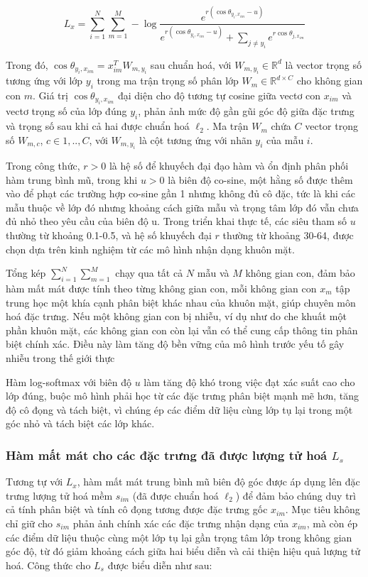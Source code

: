\begin{equation}
    L_x = \sum_{i=1}^N \sum_{m=1}^M - \log \frac{e^{r(\cos\theta_{y_i, x_{im}} - u)}}{e^{r(\cos\theta_{y_i, x_{im}} - u)} + \sum_{j \neq y_i} e^{r\cos\theta_{j, x_{im}}}}
\end{equation}

Trong đó, $\cos \theta_{y_i, x_{im}} = x^T_{im} W_{m,y_i}$ sau chuẩn hoá, với $W_{m,y_i} \in \mathbb{R}^d$ là vector trọng số tương ứng với lớp $y_i$ trong ma trận trọng số phân lớp $W_m \in \mathbb{R}^{d \times C}$ cho không gian con $m$. Giá trị $\cos \theta_{y_i, x_{im}}$ đại diện cho độ tương tự cosine giữa vectơ con $x_{im}$ và vectơ trọng số của lớp đúng $y_i$, phản ảnh mức độ gần gũi góc độ giữa đặc trưng và trọng số sau khi cả hai được chuẩn hoá $\ell_2$. Ma trận $W_m$ chứa $C$ vector trọng số $W_{m,c}$, $ c \in {1,..,C}$, với $W_{m,y_i}$ là cột tương ứng với nhãn $y_i$ của mẫu $i$.

Trong công thức, $r > 0$ là hệ số để khuyếch đại đạo hàm và ổn định phân phối hàm trung bình mũ, trong khi $u > 0$ là biên độ co-sine, một hằng số được thêm vào để phạt các trường hợp co-sine gần 1 nhưng không đủ cô đặc, tức là khi các mẫu thuộc về lớp đó nhưng khoảng cách giữa mẫu và trọng tâm lớp đó vẫn chưa đủ nhỏ theo yêu cầu của biên độ u. Trong triển khai thực tế, các siêu tham số $u$ thường từ khoảng 0.1-0.5, và hệ số khuyếch đại $r$ thường từ khoảng 30-64, được chọn dựa trên kinh nghiệm từ các mô hình nhận dạng khuôn mặt.

Tổng kép $ \sum_{i=1}^N \sum_{m=1}^M $ chạy qua tất cả $N$ mẫu và $M$ không gian con, đảm bảo hàm mất mát được tính theo từng không gian con, mỗi không gian con $x_m$ tập trung học một khía cạnh phân biệt khác nhau của khuôn mặt, giúp chuyên môn hoá đặc trưng. Nếu một không gian con bị nhiễu, ví dụ như do che khuất một phần khuôn mặt, các không gian con còn lại vẫn có thể cung cấp thông tin phân biệt chính xác. Điều này làm tăng độ bền vững của mô hình trước yếu tố gây nhiễu trong thế giới thực

Hàm log-softmax với biên độ $u$ làm tăng độ khó trong việc đạt xác suất cao cho lớp đúng, buộc mô hình phải học từ các đặc trưng phân biệt mạnh mẽ hơn, tăng độ cô đọng và tách biệt, vì chúng ép các điểm dữ liệu cùng lớp tụ lại trong một góc nhỏ và tách biệt các lớp khác.
 
\subsubsection{Hàm mất mát cho các đặc trưng đã được lượng tử hoá $L_s$}
Tương tự với $L_x$, hàm mất mát trung bình mũ biên độ góc được áp dụng lên đặc trưng lượng tử hoá mềm $s_{im}$ (đã được chuẩn hoá $\ell_2$) để đảm bảo chúng duy trì cả tính phân biệt và tính cô đọng tương được đặc trưng gốc $x_{im}$. Mục tiêu không chỉ giữ cho $s_{im}$ phản ảnh chính xác các đặc trưng nhận dạng của $x_{im}$, mà còn ép các điểm dữ liệu thuộc cùng một lớp tụ lại gần trọng tâm lớp trong không gian góc độ, từ đó giảm khoảng cách giữa hai biểu diễn và cải thiện hiệu quả lượng tử hoá. Công thức cho $L_s$ được biểu diễn như sau:

